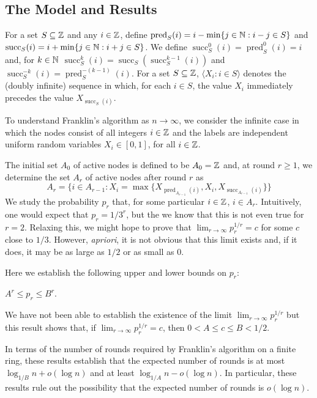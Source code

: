 \documentclass{patmorin}
\DeclareMathOperator{\cw}{succ}
\DeclareMathOperator{\ccw}{pred}
\begin{document}
\subsection{The Model and Results}

For a set $S\subseteq\mathbb{Z}$ and any $i\in\mathbb{Z}$, define $\ccw_S(i) =
i-\min\{j\in\N: i-j\in S\}$ and $\cw_S(i) = i+\min\{j\in\N: i+j\in S\}$.
We define $\cw_S^0(i)=\ccw_S^0(i)=i$ and, for $k\in\mathbb{N}$ $\cw_S^k(i) =
\cw_S(\cw_S^{k-1}(i))$ and $\cw_S^{-k}(i) = \ccw_S^{-(k-1)}(i)$.
For a set $S\subseteq\mathbb{Z}$, $\langle X_i: i\in S\rangle$ denotes the
(doubly infinite) sequence in which, for each $i\in S$, the value $X_i$ immediately precedes
the value $X_{\cw_S(i)}$.

To understand Franklin's algorithm as $n\to\infty$, we consider the infinite
case in which the nodes consist of all integers $i\in \mathbb{Z}$ and the labels are
independent uniform random variables $X_i\in[0,1]$, for all $i\in\mathbb{Z}$.

The initial set $A_0$ of active nodes is defined to be $A_0=\mathbb{Z}$ and, at round $r\ge 1$, we determine the set $A_r$ of active nodes after round $r$ as 
\[
    A_r = \{i \in A_{r-1} : X_i = \max\{X_{\ccw_{A_{r-1}}(i)},X_i,
                                      X_{\cw_{A_{r-1}}(i)}\} \} 
\] 
We study the probability $p_r$ that, for some particular $i\in\mathbb{Z}$,
$i\in A_r$.  Intuitively, one would expect that $p_r=1/3^r$, but the
we know that this is not even true for $r=2$.  Relaxing this, we might
hope to prove that $\lim_{r\to\infty} p_r^{1/r} = c$ for some $c$ close
to $1/3$.  However, \emph{apriori}, it is not obvious that this limit
exists and, if it does, it may be as large as $1/2$ or as small as $0$.

Here we establish the following upper and lower bounds on $p_r$:

\begin{thm}
   $A^r \le p_r \le B^r$.
\end{thm}

We have not been able to establish the existence of the limit
$\lim_{r\to\infty} p_r^{1/r}$ but this result shows that, if
$\lim_{r\to\infty} p_r^{1/r}=c$, then $0 < A \le c\le  B < 1/2$.

In terms of the number of rounds required by Franklin's algorithm on
a finite ring, these results establish that the expected number of
rounds is at most $\log_{1/B} n + o(\log n)$ and at least $\log_{1/A}
n- o(\log n)$.  In particular, these results rule out the possibility
that the expected number of rounds is $o(\log n)$.
\end{document}
